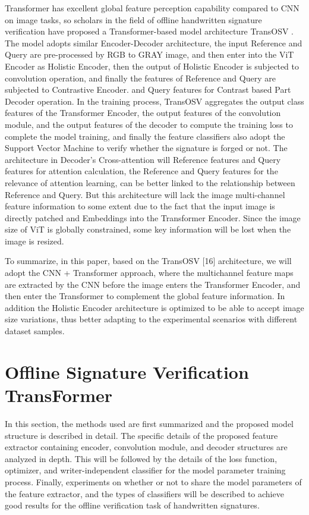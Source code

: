 \documentclass{article}
\begin{document}
Transformer has excellent global feature perception capability compared to CNN on image tasks, so scholars in the field of offline handwritten signature verification have proposed a Transformer-based model architecture TransOSV \cite{16}. The model adopts similar Encoder-Decoder architecture, the input Reference and Query are pre-processed by RGB to GRAY image, and then enter into the ViT Encoder as Holistic Encoder, then the output of Holistic Encoder is subjected to convolution operation, and finally the features of Reference and Query are subjected to Contrastive Encoder. and Query features for Contrast based Part Decoder operation. In the training process, TransOSV aggregates the output class features of the Transformer Encoder, the output features of the convolution module, and the output features of the decoder to compute the training loss to complete the model training, and finally the feature classifiers also adopt the Support Vector Machine to verify whether the signature is forged or not. The architecture in Decoder's Cross-attention will Reference features and Query features for attention calculation, the Reference and Query features for the relevance of attention learning, can be better linked to the relationship between Reference and Query. But this architecture will lack the image multi-channel feature information to some extent due to the fact that the input image is directly patched and Embeddings into the Transformer Encoder. Since the image size of ViT is globally constrained, some key information will be lost when the image is resized.

To summarize, in this paper, based on the TransOSV [16] architecture, we will adopt the CNN + Transformer approach, where the multichannel feature maps are extracted by the CNN before the image enters the Transformer Encoder, and then enter the Transformer to complement the global feature information. In addition the Holistic Encoder architecture is optimized to be able to accept image size variations, thus better adapting to the experimental scenarios with different dataset samples.



\newpage
\section{Offline Signature Verification TransFormer}

In this section, the methods used are first summarized and the proposed model structure is described in detail. The specific details of the proposed feature extractor containing encoder, convolution module, and decoder structures are analyzed in depth. This will be followed by the details of the loss function, optimizer, and writer-independent classifier \cite{17} for the model parameter training process. Finally, experiments on whether or not to share the model parameters of the feature extractor, and the types of classifiers will be described to achieve good results for the offline verification task of handwritten signatures.
\end{document}
